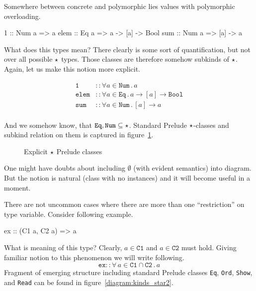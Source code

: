 \documentclass[11pt,oneside,draft]{fithesis2}
\newtheorem{example}{Example}
\begin{document}
Somewhere between concrete and polymorphic lies values with polymorphic overloading.
\begin{code}
1    :: Num a => a
elem :: Eq a => a -> [a] -> Bool
sum  :: Num a => [a] -> a
\end{code}
What does this types mean? There clearly is some sort of quantification, but not over all
possible \(\star\) types. Those classes are therefore somehow subkinds of \(\star\).
Again, let us make this notion more explicit.

\begin{align*}
\texttt{1} & :: \forall a \in \texttt {Num} \, . \, a \\
\texttt{elem} & :: \forall a \in \texttt{Eq} \, . \, a \to [a] \to \texttt{Bool} \\
\texttt{sum} & :: \forall a \in \texttt{Num} \, . \, [a] \to a \\
\end{align*}

And we somehow know, that \( \texttt{Eq}, \texttt{Num} \subseteq \star \).
Standard Prelude \(\star\)-classes and subkind relation on them is
captured in figure~\ref{diagram:kinds_star1}.
\noindent
\begin{figure}
	\centering
	\scalebox{0.9}{}
	\caption[Explicit ``star'' Prelude classes]{Explicit \(\star\) Prelude classes}
	\label{diagram:kinds_star1}
\end{figure}
One might have doubts about including \(\emptyset\) (with evident semantics) into diagram.
But the notion is natural (class with no instances) and it will become useful in a moment.

There are not uncommon cases where there are more than one ``restriction'' on type variable.
Consider following example.
\begin{code}
ex :: (C1 a, C2 a) => a
\end{code}
What is meaning of this type? Clearly, \( a \in \texttt{C1} \) and \( a \in \texttt{C2} \) must hold.
Giving familiar notion to this phenomenon we will write following.
\[ \texttt{ex} :: \forall \, a \in \texttt{C1} \cap \texttt{C2} \, . \, a \]
Fragment of emerging structure including standard Prelude classes \texttt{Eq}, \texttt{Ord}, \texttt{Show}, and \texttt{Read}
can be found in figure~\ref{diagram:kinds_star2}.
\end{document}
